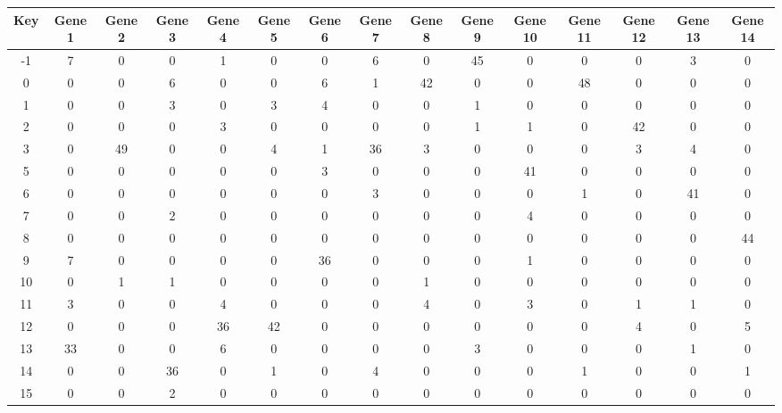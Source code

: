 \begin{tabular}{|c|c|c|c|c|c|c|c|c|c|c|c|c|c|c|}
\hline
Key & Gene 1 & Gene 2 & Gene 3 & Gene 4 & Gene 5 & Gene 6 & Gene 7 & Gene 8 & Gene 9 & Gene 10 & Gene 11 & Gene 12 & Gene 13 & Gene 14 \\
\hline
-1 & 7 & 0 & 0 & 1 & 0 & 0 & 6 & 0 & 45 & 0 & 0 & 0 & 3 & 0 \\
0 & 0 & 0 & 6 & 0 & 0 & 6 & 1 & 42 & 0 & 0 & 48 & 0 & 0 & 0 \\
1 & 0 & 0 & 3 & 0 & 3 & 4 & 0 & 0 & 1 & 0 & 0 & 0 & 0 & 0 \\
2 & 0 & 0 & 0 & 3 & 0 & 0 & 0 & 0 & 1 & 1 & 0 & 42 & 0 & 0 \\
3 & 0 & 49 & 0 & 0 & 4 & 1 & 36 & 3 & 0 & 0 & 0 & 3 & 4 & 0 \\
5 & 0 & 0 & 0 & 0 & 0 & 3 & 0 & 0 & 0 & 41 & 0 & 0 & 0 & 0 \\
6 & 0 & 0 & 0 & 0 & 0 & 0 & 3 & 0 & 0 & 0 & 1 & 0 & 41 & 0 \\
7 & 0 & 0 & 2 & 0 & 0 & 0 & 0 & 0 & 0 & 4 & 0 & 0 & 0 & 0 \\
8 & 0 & 0 & 0 & 0 & 0 & 0 & 0 & 0 & 0 & 0 & 0 & 0 & 0 & 44 \\
9 & 7 & 0 & 0 & 0 & 0 & 36 & 0 & 0 & 0 & 1 & 0 & 0 & 0 & 0 \\
10 & 0 & 1 & 1 & 0 & 0 & 0 & 0 & 1 & 0 & 0 & 0 & 0 & 0 & 0 \\
11 & 3 & 0 & 0 & 4 & 0 & 0 & 0 & 4 & 0 & 3 & 0 & 1 & 1 & 0 \\
12 & 0 & 0 & 0 & 36 & 42 & 0 & 0 & 0 & 0 & 0 & 0 & 4 & 0 & 5 \\
13 & 33 & 0 & 0 & 6 & 0 & 0 & 0 & 0 & 3 & 0 & 0 & 0 & 1 & 0 \\
14 & 0 & 0 & 36 & 0 & 1 & 0 & 4 & 0 & 0 & 0 & 1 & 0 & 0 & 1 \\
15 & 0 & 0 & 2 & 0 & 0 & 0 & 0 & 0 & 0 & 0 & 0 & 0 & 0 & 0 \\
\hline
\end{tabular}